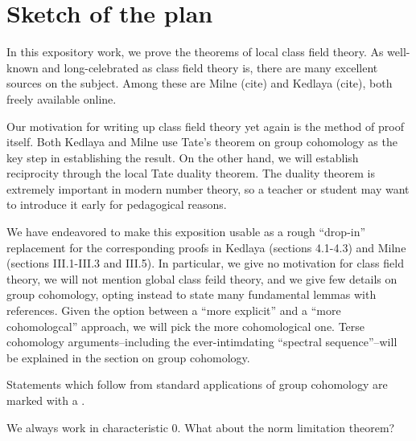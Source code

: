 
\section{Sketch of the plan}


In this expository work, we prove the theorems of 
local class field theory. 
As well-known and long-celebrated as class field theory is, 
there are many excellent sources on the subject. 
Among these are Milne (cite) and Kedlaya (cite), both freely
available online. 

Our motivation for writing up class field theory yet again 
is the method
of proof itself. 
Both Kedlaya and Milne use Tate's theorem on group cohomology
as the key step in establishing the result. 
On the other hand, we will establish reciprocity through
the local Tate duality theorem.
The duality theorem is extremely important in modern number
theory, so a teacher or student 
may want to introduce it early for pedagogical reasons.

We have endeavored to make this exposition usable as a 
rough
``drop-in'' replacement for the corresponding proofs 
in Kedlaya (sections 4.1-4.3) and 
Milne (sections III.1-III.3 and III.5).
In particular, we give no motivation for class field 
theory, we will not mention global class feild theory,
and we give few details on group cohomology,
opting instead to state many fundamental lemmas with references.
Given the option between a ``more explicit'' and a
``more cohomologcal'' approach, we will pick the
more cohomological one.
Terse cohomology arguments--including the ever-intimdating
``spectral sequence''--will be explained in the section on
group cohomology.

Statements which follow from standard applications
of group cohomology are marked with a \coproof.

We always work in characteristic 0.
What about the norm limitation theorem?

